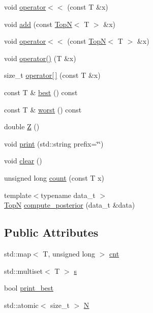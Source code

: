 \begin{DoxyCompactItemize}
\item 
void \hyperlink{class_fleet_1_1_statistics_1_1_top_n_af54651d8e83bdcc6b3ffbcef3aa3fd6e}{operator$<$$<$} (const T \&x)
\item 
void \hyperlink{class_fleet_1_1_statistics_1_1_top_n_ac1a720c5f52f0486377274bd1e6a052a}{add} (const \hyperlink{class_fleet_1_1_statistics_1_1_top_n}{TopN}$<$ T $>$ \&x)
\item 
void \hyperlink{class_fleet_1_1_statistics_1_1_top_n_a73cb4911b6dc2bdc56f466ca4b93ef9d}{operator$<$$<$} (const \hyperlink{class_fleet_1_1_statistics_1_1_top_n}{TopN}$<$ T $>$ \&x)
\item 
void \hyperlink{class_fleet_1_1_statistics_1_1_top_n_a3300639fe8eef303fb66e1630dc0790c}{operator()} (T \&x)
\item 
size\+\_\+t \hyperlink{class_fleet_1_1_statistics_1_1_top_n_acb11e623b45dbec10f2c1ac9a48b0eef}{operator\mbox{[}$\,$\mbox{]}} (const T \&x)
\item 
const T \& \hyperlink{class_fleet_1_1_statistics_1_1_top_n_aeab09f4da77161e1743d03780eb4d6b8}{best} () const
\item 
const T \& \hyperlink{class_fleet_1_1_statistics_1_1_top_n_aab552495129498fc792b8d5990c6a746}{worst} () const
\item 
double \hyperlink{class_fleet_1_1_statistics_1_1_top_n_aa94e0f1e4df0ba70b35abcc540b7cb03}{Z} ()
\item 
void \hyperlink{class_fleet_1_1_statistics_1_1_top_n_ae37eb4f39eb12d32a1f04aa30276da86}{print} (std\+::string prefix=\char`\"{}\char`\"{})
\item 
void \hyperlink{class_fleet_1_1_statistics_1_1_top_n_ab57188b1858802dcf1f26dbcf702c6ae}{clear} ()
\item 
unsigned long \hyperlink{class_fleet_1_1_statistics_1_1_top_n_a341df027d3283fe3a9bf3766521e126d}{count} (const T x)
\item 
{\footnotesize template$<$typename data\+\_\+t $>$ }\\\hyperlink{class_fleet_1_1_statistics_1_1_top_n}{TopN} \hyperlink{class_fleet_1_1_statistics_1_1_top_n_a620e95f050930e7aa5d02e72365f8e88}{compute\+\_\+posterior} (data\+\_\+t \&data)
\end{DoxyCompactItemize}
\subsection*{Public Attributes}
\begin{DoxyCompactItemize}
\item 
std\+::map$<$ T, unsigned long $>$ \hyperlink{class_fleet_1_1_statistics_1_1_top_n_a0f5ecded3f85aeeb85da2f2b3056b466}{cnt}
\item 
std\+::multiset$<$ T $>$ \hyperlink{class_fleet_1_1_statistics_1_1_top_n_aa17d03f1154073197161f59657d4c80b}{s}
\item 
bool \hyperlink{class_fleet_1_1_statistics_1_1_top_n_a1ee284a643f14a5c4670b4c5f61f5262}{print\+\_\+best}
\item 
std\+::atomic$<$ size\+\_\+t $>$ \hyperlink{class_fleet_1_1_statistics_1_1_top_n_a7a9612e75b42451eef7db77498050e7a}{N}
\end{DoxyCompactItemize}


